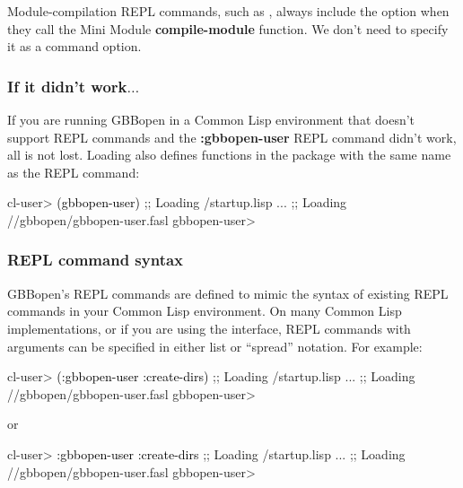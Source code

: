 \documentclass[10pt,twoside,english,pdftex]{article}
\begin{document}
Module-compilation REPL commands, such as ,
always include the  option when they call the Mini Module
\textbf{compile-module} function.  We don't need to specify it as a command
option.

\subsubsection*{If it didn't work$\ldots$}

If you are running GBBopen in a Common Lisp environment that doesn't support
REPL commands and the \textbf{:gbbopen-user} REPL command didn't
work, all is not lost.  Loading 
also defines functions in the  package with the same
name as the REPL command:
%
\W\supp
\begin{example}
\textcolor{darkergray}{%
  cl-user> \textcolor{black}{(gbbopen-user)}
  ;; Loading /startup.lisp
     ...
  ;; Loading //gbbopen/gbbopen-user.fasl
  gbbopen-user>}
\end{example}

\subsubsection*{REPL command syntax}
\label{sec:REPL-command-syntax}

GBBopen's REPL commands are defined to mimic the syntax of existing REPL
commands in your Common Lisp environment.  On many Common Lisp
implementations, or if you are using the
 interface, REPL
commands with arguments can be specified in either list or ``spread''
notation.  For example:
%
\W\supp
\begin{example}
\textcolor{darkergray}{%
  cl-user> \textcolor{black}{(:gbbopen-user :create-dirs)}
  ;; Loading /startup.lisp
     ...
  ;; Loading //gbbopen/gbbopen-user.fasl
  gbbopen-user>}
\end{example}
%
or
%
\W\supp\notpretop
\begin{example}
\textcolor{darkergray}{%
  cl-user> \textcolor{black}{:gbbopen-user :create-dirs}
  ;; Loading /startup.lisp
     ...
  ;; Loading //gbbopen/gbbopen-user.fasl
  gbbopen-user>}
\end{example}
\end{document}
